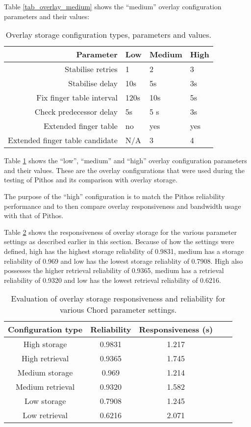 Table \ref{tab_overlay_medium} shows the ``medium'' overlay configuration parameters and their values:
%
\begin{table}[htbp]
\centering
\begin{tabular}{|r|l|l|l|}
\hline
Parameter                       & Low  & Medium & High  \\
\hline
Stabilise retries               & 1    & 2      &  3    \\
Stabilise delay                 & 10s  & 5s     &  3s   \\
Fix finger table interval       & 120s & 10s    &  5s   \\
Check predecessor delay         & 5s   & 5 s    &  3s   \\
Extended finger table           & no   & yes    &  yes  \\
Extended finger table candidate & N/A  & 3      &  4    \\
\hline
\end{tabular}
\caption{Overlay storage configuration types, parameters and values.}
\label{tab_overlay_configs}
\end{table}

Table \ref{tab_overlay_configs} shows the ``low'', ``medium'' and ``high'' overlay configuration parameters and their values. These are the overlay configurations that were used during the testing of Pithos and its comparison with overlay storage.

The purpose of the ``high'' configuration is to match the Pithos reliability performance and to then compare overlay responsiveness and bandwidth usage with that of Pithos.

Table \ref{tab_overlay_rel_resp_results} shows the responsiveness of overlay storage for the various parameter settings as described earlier in this section. Because of how the settings were defined, high has the highest storage reliability of 0.9831, medium has a storage reliability of 0.969 and low has the lowest storage reliablity of 0.7908. High also possesses the higher retrieval reliability of 0.9365, medium has a retrieval reliability of 0.9320 and low has the lowest retrieval reliability of 0.6216.
%
\begin{table}[htbp]
\centering
\begin{tabular}{|c|c|c|c|c|}
\hline
Configuration type & Reliability & Responsiveness (s)\\
\hline
High storage     &   0.9831      &   1.217  \\
High retrieval   &   0.9365      &   1.745  \\
Medium storage   &   0.969       &   1.214  \\
Medium retrieval &   0.9320      &   1.582  \\
Low storage      &   0.7908      &   1.245  \\
Low retrieval    &   0.6216      &   2.071  \\
\hline
\end{tabular}
\caption{Evaluation of overlay storage responsiveness and reliability for various Chord parameter settings.}
\label{tab_overlay_rel_resp_results}
\end{table}

